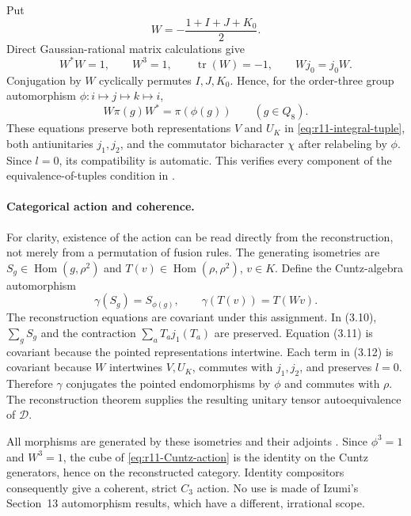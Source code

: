 Put
\begin{equation}\label{eq:r11-order-three-W}
 W=-\frac{1+I+J+K_0}{2}.
\end{equation}
Direct Gaussian-rational matrix calculations give
\[
 W^*W=1,\qquad W^3=1,\qquad \operatorname{tr}(W)=-1,
 \qquad Wj_0=j_0W.
\]
Conjugation by $W$ cyclically permutes $I,J,K_0$. Hence, for the order-three
group automorphism $\phi:i\mapsto j\mapsto k\mapsto i$,
\[
 W\pi(g)W^*=\pi(\phi(g))\qquad(g\in Q_8).
\]
These equations preserve both representations $V$ and $U_K$ in
\eqref{eq:r11-integral-tuple}, both antiunitaries $j_1,j_2$, and the
commutator bicharacter $\chi$ after relabeling by $\phi$. Since $l=0$, its
compatibility is automatic. This verifies every component of the
equivalence-of-tuples condition in \cite[Definition~4.8]{Izumi}.

\paragraph{Categorical action and coherence.}
For clarity, existence of the action can be read directly from the
reconstruction, not merely from a permutation of fusion rules.
The generating isometries are
$S_g\in\operatorname{Hom}(g,\rho^2)$ and
$T(v)\in\operatorname{Hom}(\rho,\rho^2)$, $v\in K$.
Define the Cuntz-algebra automorphism
\begin{equation}\label{eq:r11-Cuntz-action}
 \gamma(S_g)=S_{\phi(g)},\qquad
 \gamma(T(v))=T(Wv).
\end{equation}
The reconstruction equations \cite[(3.10)--(3.12)]{Izumi} are covariant
under this assignment. In (3.10), $\sum_gS_g$ and the contraction
$\sum_a T_a j_1(T_a)$ are preserved. Equation (3.11) is covariant because
the pointed representations intertwine. Each term in (3.12) is covariant
because $W$ intertwines $V,U_K$, commutes with $j_1,j_2$, and preserves
$l=0$. Therefore $\gamma$ conjugates the pointed endomorphisms by $\phi$
and commutes with $\rho$. The reconstruction theorem
\cite[Theorem~4.9]{Izumi} supplies the resulting unitary tensor
autoequivalence of $\mathcal D$.

All morphisms are generated by these isometries and their adjoints
\cite[Remark~3.6]{Izumi}. Since $\phi^3=1$ and $W^3=1$, the cube of
\eqref{eq:r11-Cuntz-action} is the identity on the Cuntz generators,
hence on the reconstructed category. Identity compositors consequently
give a coherent, strict $C_3$ action. No use is made of Izumi's Section~13
automorphism results, which have a different, irrational scope.

